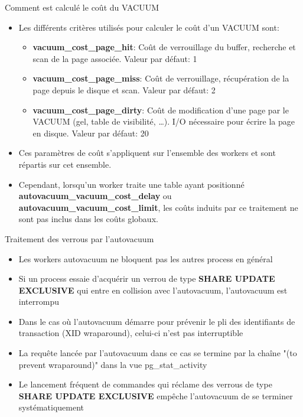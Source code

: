 \begin{frame}[fragile]{Comment est calculé le coût du VACUUM}

\begin{itemize}
   \item Les différents critères utilisés pour calculer le coût d'un VACUUM sont:
   \begin{itemize}
      \item \textbf{vacuum\_cost\_page\_hit}: Coût de verrouillage du buffer, recherche et scan de la page associée. Valeur par défaut: 1
      \item \textbf{vacuum\_cost\_page\_miss}: Coût de verrouillage, récupération de la page depuis le disque et scan. Valeur par défaut: 2
      \item \textbf{vacuum\_cost\_page\_dirty}: Coût de modification d'une page par le VACUUM (gel, table de visibilité, \ldots). I/O nécessaire pour écrire la page en disque. Valeur par défaut: 20
   \end{itemize}
   \item Ces paramètres de coût s'appliquent sur l'ensemble des workers et sont répartis sur cet ensemble.
   \item Cependant, lorsqu'un worker traite une table ayant positionné \textbf{autovacuum\_vacuum\_cost\_delay} ou \textbf{autovacuum\_vacuum\_cost\_limit}, les coûts induits par ce traitement ne sont pas inclus dans les coûts globaux.
\end{itemize}

\begin{tiny}
\begin{toile}
\end{toile}
\end{tiny}

\end{frame}


\begin{frame}{Traitement des verrous par l'autovacuum}

\begin{itemize}
   \item Les workers autovacuum ne bloquent pas les autres process en général
   \item Si un process essaie d'acquérir un verrou de type \textbf{SHARE UPDATE EXCLUSIVE} qui entre en collision avec l'autovacuum, l'autovacuum est interrompu
   \item Dans le cas où l'autovacuum démarre pour prévenir le pli des identifiants de transaction (XID wraparound), celui-ci n'est pas interruptible
   \item La requête lancée par l'autovacuum dans ce cas se termine par la chaîne "(to prevent wraparound)" dans la vue pg\_stat\_activity
   \item Le lancement fréquent de commandes qui réclame des verrous de type \textbf{SHARE UPDATE EXCLUSIVE} empêche l'autovacuum de se terminer systématiquement
\end{itemize}

\end{frame}

